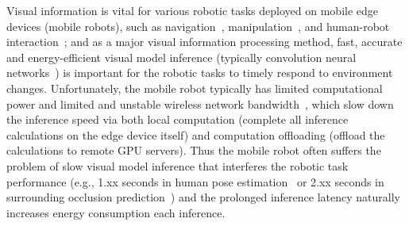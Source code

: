 Visual information is vital for various robotic tasks deployed on mobile edge devices (mobile robots), such as navigation~\cite{ran2017convolutional}, manipulation~\cite{bayar2018constrained}, and human-robot interaction~\cite{wu2019weight};
and as a major visual information processing method, fast, accurate and energy-efficient visual model inference (typically convolution neural networks~\cite{kapao,targ2016resnet,woo2023convnext}) is important for the robotic tasks to timely respond to environment changes. 
Unfortunately, the mobile robot typically has limited computational power and limited and unstable wireless network bandwidth~\cite{yang2022mobile}, which slow down the inference speed via both local computation (complete all inference calculations on the edge device itself) and computation offloading (offload the calculations to remote GPU servers).
Thus the mobile robot often suffers the problem of slow visual model inference that interferes the robotic task performance (e.g., 1.xx seconds in human pose estimation~\cite{kapao} or 2.xx seconds in surrounding occlusion prediction~\cite{agrnav}) and the prolonged inference latency naturally increases energy consumption each inference.

